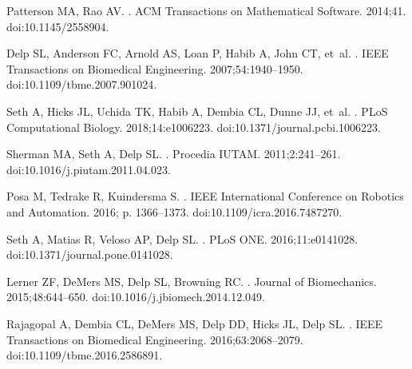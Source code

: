 \documentclass[10pt,letterpaper]{article}
\begin{document}
\begin{thebibliography}{10}
    Patterson MA, Rao AV.
    .
    \newblock ACM Transactions on Mathematical Software. 2014;41.
    \newblock doi:{10.1145/2558904}.

    Delp SL, Anderson FC, Arnold AS, Loan P, Habib A, John CT, et~al.
    .
    \newblock IEEE Transactions on Biomedical Engineering. 2007;54:1940--1950.
    \newblock doi:{10.1109/tbme.2007.901024}.

    Seth A, Hicks JL, Uchida TK, Habib A, Dembia CL, Dunne JJ, et~al.
    .
    \newblock PLoS Computational Biology. 2018;14:e1006223.
    \newblock doi:{10.1371/journal.pcbi.1006223}.

    Sherman MA, Seth A, Delp SL.
    .
    \newblock Procedia IUTAM. 2011;2:241--261.
    \newblock doi:{10.1016/j.piutam.2011.04.023}.

    Posa M, Tedrake R, Kuindersma S.
    .
     IEEE International Conference on Robotics and Automation. 2016;
    p. 1366--1373.
    \newblock doi:{10.1109/icra.2016.7487270}.

    Seth A, Matias R, Veloso AP, Delp SL.
    .
    \newblock PLoS ONE. 2016;11:e0141028.
    \newblock doi:{10.1371/journal.pone.0141028}.

    Lerner ZF, DeMers MS, Delp SL, Browning RC.
    .
    \newblock Journal of Biomechanics. 2015;48:644--650.
    \newblock doi:{10.1016/j.jbiomech.2014.12.049}.

    Rajagopal A, Dembia CL, DeMers MS, Delp DD, Hicks JL, Delp SL.
    .
    \newblock IEEE Transactions on Biomedical Engineering. 2016;63:2068--2079.
    \newblock doi:{10.1109/tbme.2016.2586891}.


\end{thebibliography}
\end{document}
